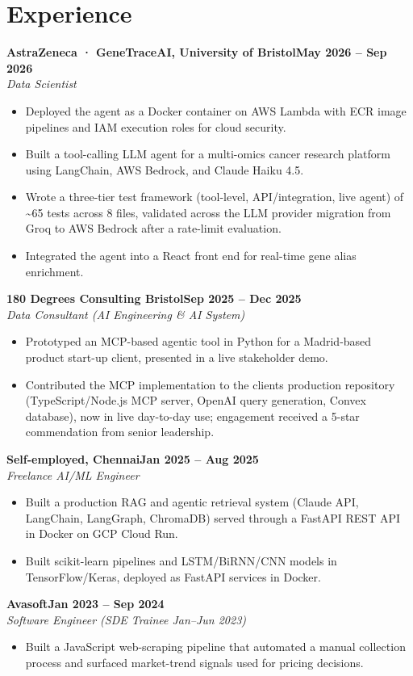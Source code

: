 \documentclass[a4paper,10pt]{article}
\newcommand{\entry}[4]{\noindent\textbf{#1}\hfill\textbf{#2}\\ \textit{#3}\hfill\textit{#4}\par}
\begin{document}
\section{Experience}
\entry{AstraZeneca · GeneTraceAI, University of Bristol}{May 2026 – Sep 2026}{Data Scientist}{}
\begin{itemize}
  \item Deployed the agent as a Docker container on AWS Lambda with ECR image pipelines and IAM execution roles for cloud security.
  \item Built a tool-calling LLM agent for a multi-omics cancer research platform using LangChain, AWS Bedrock, and Claude Haiku 4.5.
  \item Wrote a three-tier test framework (tool-level, API/integration, live agent) of \textasciitilde{}65 tests across 8 files, validated across the LLM provider migration from Groq to AWS Bedrock after a rate-limit evaluation.
  \item Integrated the agent into a React front end for real-time gene alias enrichment.
\end{itemize}
\vspace{3pt}
\entry{180 Degrees Consulting Bristol}{Sep 2025 – Dec 2025}{Data Consultant (AI Engineering \& AI System)}{}
\begin{itemize}
  \item Prototyped an MCP-based agentic tool in Python for a Madrid-based product start-up client, presented in a live stakeholder demo.
  \item Contributed the MCP implementation to the client\textquotesingle{}s production repository (TypeScript/Node.js MCP server, OpenAI query generation, Convex database), now in live day-to-day use; engagement received a 5-star commendation from senior leadership.
\end{itemize}
\vspace{3pt}
\entry{Self-employed, Chennai}{Jan 2025 – Aug 2025}{Freelance AI/ML Engineer}{}
\begin{itemize}
  \item Built a production RAG and agentic retrieval system (Claude API, LangChain, LangGraph, ChromaDB) served through a FastAPI REST API in Docker on GCP Cloud Run.
  \item Built scikit-learn pipelines and LSTM/BiRNN/CNN models in TensorFlow/Keras, deployed as FastAPI services in Docker.
\end{itemize}
\vspace{3pt}
\entry{Avasoft}{Jan 2023 – Sep 2024}{Software Engineer (SDE Trainee Jan–Jun 2023)}{}
\begin{itemize}
  \item Built a JavaScript web-scraping pipeline that automated a manual collection process and surfaced market-trend signals used for pricing decisions.
\end{itemize}
\end{document}
